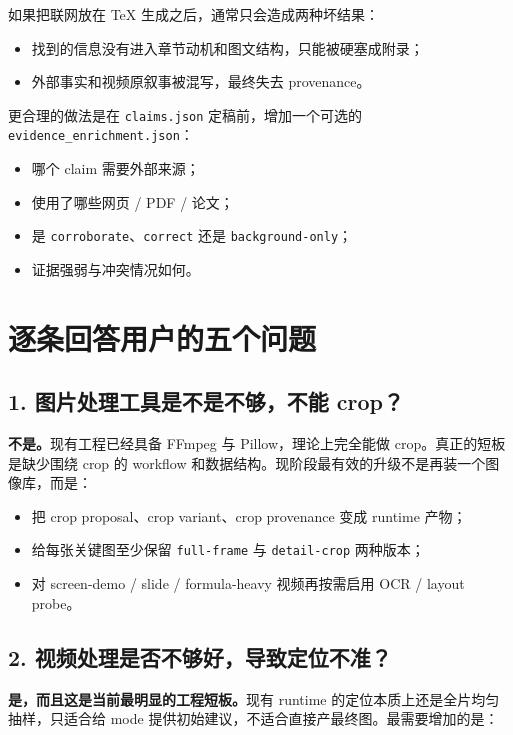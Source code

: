 \documentclass[a4paper]{article}
\begin{document}
如果把联网放在 TeX 生成之后，通常只会造成两种坏结果：

\begin{itemize}
\item 找到的信息没有进入章节动机和图文结构，只能被硬塞成附录；
\item 外部事实和视频原叙事被混写，最终失去 provenance。
\end{itemize}

更合理的做法是在 \texttt{claims.json} 定稿前，增加一个可选的 \texttt{evidence\_enrichment.json}：

\begin{itemize}
\item 哪个 claim 需要外部来源；
\item 使用了哪些网页 / PDF / 论文；
\item 是 \texttt{corroborate}、\texttt{correct} 还是 \texttt{background-only}；
\item 证据强弱与冲突情况如何。
\end{itemize}

\section{逐条回答用户的五个问题}

\subsection{1. 图片处理工具是不是不够，不能 crop？}

\textbf{不是。}现有工程已经具备 FFmpeg 与 Pillow，理论上完全能做 crop。真正的短板是缺少围绕 crop 的 workflow 和数据结构。现阶段最有效的升级不是再装一个图像库，而是：

\begin{itemize}
\item 把 crop proposal、crop variant、crop provenance 变成 runtime 产物；
\item 给每张关键图至少保留 \texttt{full-frame} 与 \texttt{detail-crop} 两种版本；
\item 对 screen-demo / slide / formula-heavy 视频再按需启用 OCR / layout probe。
\end{itemize}

\subsection{2. 视频处理是否不够好，导致定位不准？}

\textbf{是，而且这是当前最明显的工程短板。}现有 runtime 的定位本质上还是全片均匀抽样，只适合给 mode 提供初始建议，不适合直接产最终图。最需要增加的是：
\end{document}

